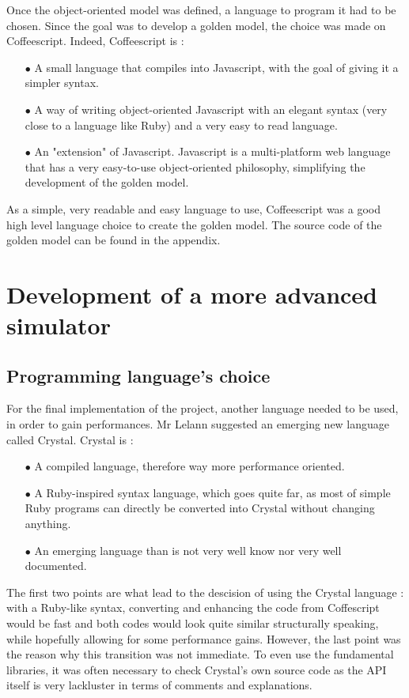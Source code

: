 \documentclass[a4paper,12pt]{report}
\newcommand{\para}[1]{\par{#1}\\}
\begin{document}
\para{
    Once the object-oriented model was defined, a language to program it had to be chosen. Since the goal was to develop a golden model, the choice was made on Coffeescript. Indeed, Coffeescript is :
}

\begin{itemize}
\item[$\bullet$] A small language that compiles into Javascript, with the goal of giving it a simpler syntax.
\item[$\bullet$] A way of writing object-oriented Javascript with an elegant syntax (very close to a language like Ruby) and a very easy to read language.
\item[$\bullet$] An "extension" of Javascript. Javascript is a multi-platform web language that has a very easy-to-use object-oriented philosophy, simplifying the development of the golden model.
\end{itemize}

\para{
    As a simple, very readable and easy language to use, Coffeescript was a good high level language choice to create the golden model. The source code of the golden model can be found in the appendix.
}

    \section{Development of a more advanced simulator}
        \subsection{Programming language's choice}

\para{
    For the final implementation of the project, another language needed to be used, in order to gain performances. Mr Lelann suggested an emerging new language called Crystal. Crystal is :
}

\begin{itemize}
\item[$\bullet$] A compiled language, therefore way more performance oriented.
\item[$\bullet$] A Ruby-inspired syntax language, which goes quite far, as most of simple Ruby programs can directly be converted into Crystal without changing anything.
\item[$\bullet$] An emerging language than is not very well know nor very well documented.
\end{itemize}

\para{
    The first two points are what lead to the descision of using the Crystal language : with a Ruby-like syntax, converting and enhancing the code from Coffescript would be fast and both codes would look quite similar structurally speaking, while hopefully allowing for some performance gains. However, the last point was the reason why this transition was not immediate. To even use the fundamental libraries, it was often necessary to check Crystal's own source code as the API itself is very lackluster in terms of comments and explanations.
}
\end{document}
